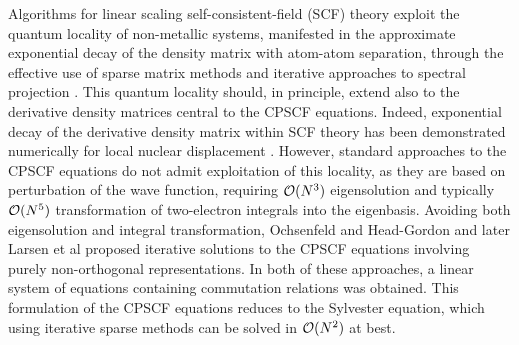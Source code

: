 \documentclass[prl,aps,twocolumn,showpacs,twocolumngrid,superbib]{revtex4}
\begin{document}
Algorithms for linear scaling self-consistent-field (SCF) theory exploit the quantum locality
of non-metallic systems, manifested in the approximate exponential decay of the density matrix 
with atom-atom separation, through the effective use of sparse matrix methods and iterative 
approaches to spectral projection \cite{ANiklasson02A,ANiklasson03}.   This quantum locality should, 
in principle, extend also to the derivative density matrices central to the CPSCF equations.  Indeed,  
exponential decay of the derivative density matrix within SCF theory has been demonstrated numerically
for local nuclear displacement \cite{Ochsenfeld_1997}. However, standard approaches to the CPSCF equations 
\cite{Pople_1979,Sekino_1986,Dupuis_1991} do not admit exploitation of this locality, as they are based 
on perturbation of the wave function, requiring ${\cal O}(N^3)$ eigensolution and typically ${\cal O}(N^5)$ 
transformation of two-electron integrals into the eigenbasis.   Avoiding both 
eigensolution and integral transformation,  Ochsenfeld and Head-Gordon \cite{Ochsenfeld_1997} and
later Larsen et al \cite{Helgaker_2001} proposed iterative solutions to the CPSCF equations 
involving purely non-orthogonal representations.   In both of these approaches, a 
linear system of equations containing commutation relations  was obtained.  This formulation
of the CPSCF equations reduces to the Sylvester equation, which using iterative sparse
methods can be solved in ${\cal O}(N^2)$ \cite{JBrandts01} at best.
\end{document}
